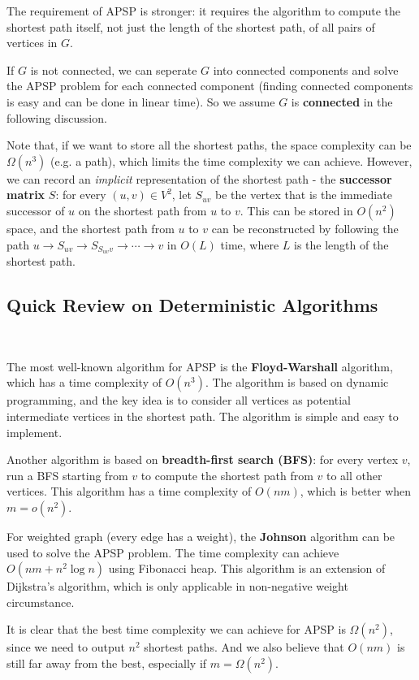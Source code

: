 \documentclass[12pt]{article}
\theoremstyle{plain}
\begin{document}
The requirement of APSP is stronger: it requires the algorithm to compute the shortest path itself, not just the length of the shortest path, of all pairs of vertices in $G$. 

If $G$ is not connected, we can seperate $G$ into connected components and solve the APSP problem for each connected component (finding connected components is easy and can be done in linear time). So we assume $G$ is \textbf{connected} in the following discussion.

Note that, if we want to store all the shortest paths, the space complexity can be $\Omega(n^3)$ (e.g. a path), which limits the time complexity we can achieve. However, we can record an \emph{implicit} representation of the shortest path - the \textbf{successor matrix} $S$: for every $(u,v)\in V^2$, let $S_{uv}$ be the vertex that is the immediate successor of $u$ on the shortest path from $u$ to $v$. This can be stored in $O(n^2)$ space, and the shortest path from $u$ to $v$ can be reconstructed by following the path $u\to S_{uv}\to S_{S_{uv}v}\to\cdots\to v$ in $O(L)$ time, where $L$ is the length of the shortest path.

\subsection{Quick Review on Deterministic Algorithms}\

The most well-known algorithm for APSP is the \textbf{Floyd-Warshall} algorithm, which has a time complexity of $O(n^3)$. The algorithm is based on dynamic programming, and the key idea is to consider all vertices as potential intermediate vertices in the shortest path. The algorithm is simple and easy to implement.

Another algorithm is based on \textbf{breadth-first search (BFS)}: for every vertex $v$, run a BFS starting from $v$ to compute the shortest path from $v$ to all other vertices. This algorithm has a time complexity of $O(nm)$, which is better when $m=o(n^2)$.

For weighted graph (every edge has a weight), the \textbf{Johnson} algorithm can be used to solve the APSP problem. The time complexity can achieve $O(nm+n^2\log n)$ using Fibonacci heap. This algorithm is an extension of Dijkstra's algorithm, which is only applicable in non-negative weight circumstance. 

It is clear that the best time complexity we can achieve for APSP is $\Omega(n^2)$, since we need to output $n^2$ shortest paths. And we also believe that $O(nm)$ is still far away from the best, especially if $m=\Omega(n^2)$.
\end{document}
